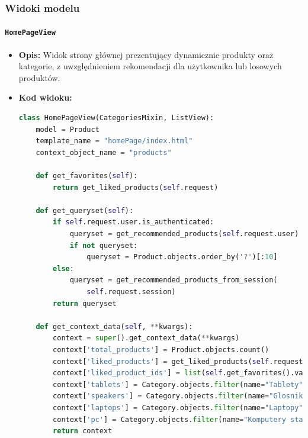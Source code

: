 \documentclass[12pt,a4paper,oneside]{article}
\theoremstyle{definition}
\numberwithin{equation}{section}
\begin{document}
\clearpage
\subsubsection{Widoki modelu}
\paragraph{\texttt{HomePageView}}
\begin{itemize}
    \item \textbf{Opis:} Widok strony głównej prezentujący dynamicznie produkty oraz kategorie, z uwzględnieniem rekomendacji dla użytkownika lub losowych produktów.
    \item \textbf{Kod widoku:}
    \begin{lstlisting}[language=Python, caption=\texttt{HomePageView}]
class HomePageView(CategoriesMixin, ListView):
    model = Product
    template_name = "homePage/index.html"
    context_object_name = "products"

    def get_favorites(self):
        return get_liked_products(self.request)

    def get_queryset(self):
        if self.request.user.is_authenticated:
            queryset = get_recommended_products(self.request.user)
            if not queryset:
                queryset = Product.objects.order_by('?')[:10]
        else:
            queryset = get_recommended_products_from_session(
                self.request.session)
        return queryset

    def get_context_data(self, **kwargs):
        context = super().get_context_data(**kwargs)
        context['total_products'] = Product.objects.count()
        context['liked_products'] = get_liked_products(self.request)
        context['liked_product_ids'] = list(self.get_favorites().values_list('id', flat=True))
        context['tablets'] = Category.objects.filter(name="Tablety").first()
        context['speakers'] = Category.objects.filter(name="Glosniki komputerowe").first()
        context['laptops'] = Category.objects.filter(name="Laptopy").first()
        context['pc'] = Category.objects.filter(name="Komputery stacjonarne").first()
        return context
    \end{lstlisting}


\end{itemize}
\end{document}
